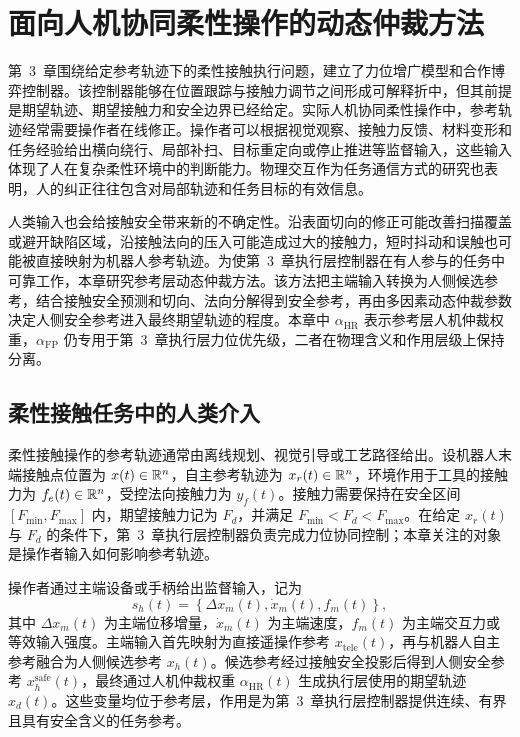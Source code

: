 \chapter{面向人机协同柔性操作的动态仲裁方法}
\label{chap:ch4_human_arbitration}

第~3~章围绕给定参考轨迹下的柔性接触执行问题，建立了力位增广模型和合作博弈控制器。该控制器能够在位置跟踪与接触力调节之间形成可解释折中，但其前提是期望轨迹、期望接触力和安全边界已经给定。实际人机协同柔性操作中，参考轨迹经常需要操作者在线修正。操作者可以根据视觉观察、接触力反馈、材料变形和任务经验给出横向绕行、局部补扫、目标重定向或停止推进等监督输入，这些输入体现了人在复杂柔性环境中的判断能力。物理交互作为任务通信方式的研究也表明，人的纠正往往包含对局部轨迹和任务目标的有效信息\cite{losey2018trajectory,losey2022physicalcommunication}。

人类输入也会给接触安全带来新的不确定性。沿表面切向的修正可能改善扫描覆盖或避开缺陷区域，沿接触法向的压入可能造成过大的接触力，短时抖动和误触也可能被直接映射为机器人参考轨迹。为使第~3~章执行层控制器在有人参与的任务中可靠工作，本章研究参考层动态仲裁方法。该方法把主端输入转换为人侧候选参考，结合接触安全预测和切向、法向分解得到安全参考，再由多因素动态仲裁参数决定人侧安全参考进入最终期望轨迹的程度。本章中 $\alpha_{\mathrm{HR}}$ 表示参考层人机仲裁权重，$\alpha_{\mathrm{FP}}$ 仍专用于第~3~章执行层力位优先级，二者在物理含义和作用层级上保持分离。

\section{柔性接触任务中的人类介入}
\label{sec:ch4_human_intervention}

柔性接触操作的参考轨迹通常由离线规划、视觉引导或工艺路径给出。设机器人末端接触点位置为 $x(t)\in\mathbb{R}^n$，自主参考轨迹为 $x_r(t)\in\mathbb{R}^n$，环境作用于工具的接触力为 $f_e(t)\in\mathbb{R}^n$，受控法向接触力为 $y_f(t)$。接触力需要保持在安全区间 $[F_{\min},F_{\max}]$ 内，期望接触力记为 $F_d$，并满足 $F_{\min}<F_d<F_{\max}$。在给定 $x_r(t)$ 与 $F_d$ 的条件下，第~3~章执行层控制器负责完成力位协同控制；本章关注的对象是操作者输入如何影响参考轨迹。

操作者通过主端设备或手柄给出监督输入，记为
\begin{equation}
  s_h(t)=\left\{\Delta x_m(t),\dot x_m(t),f_m(t)\right\},
  \label{eq:ch4_human_input}
\end{equation}
其中 $\Delta x_m(t)$ 为主端位移增量，$\dot x_m(t)$ 为主端速度，$f_m(t)$ 为主端交互力或等效输入强度。主端输入首先映射为直接遥操作参考 $x_{\mathrm{tele}}(t)$，再与机器人自主参考融合为人侧候选参考 $x_h(t)$。候选参考经过接触安全投影后得到人侧安全参考 $x_h^{\mathrm{safe}}(t)$，最终通过人机仲裁权重 $\alpha_{\mathrm{HR}}(t)$ 生成执行层使用的期望轨迹 $x_d(t)$。这些变量均位于参考层，作用是为第~3~章执行层控制器提供连续、有界且具有安全含义的任务参考。

